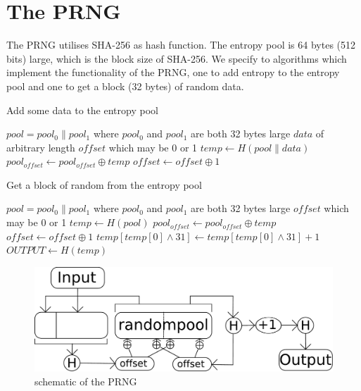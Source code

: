 \section{The PRNG}
The PRNG utilises SHA-256 as hash function.
The entropy pool is 64 bytes (512 bits) large, which is the block size of SHA-256.
We specify to algorithms which implement the functionality of the PRNG, one to add entropy to the entropy pool and one to get a block (32 bytes) of random data.
\begin{algorithm}
\caption{Add some data to the entropy pool}
\label{algAddEntropy}
\begin{algorithmic}
\REQUIRE $pool = pool_0 \parallel pool_1$ where $pool_0$ and $pool_1$ are both 32 bytes large
\REQUIRE $data$ of arbitrary length
\REQUIRE $offset$ which may be 0 or 1
\STATE $temp \leftarrow H(pool \parallel data)$
\STATE $pool_{offset} \leftarrow pool_{offset} \oplus temp$
\STATE $offset \leftarrow offset \oplus 1$
\end{algorithmic}
\end{algorithm}

\begin{algorithm}
\caption{Get a block of random from the entropy pool}
\label{algGetRandom}
\begin{algorithmic}
\REQUIRE $pool = pool_0 \parallel pool_1$ where $pool_0$ and $pool_1$ are both 32 bytes large
\REQUIRE $offset$ which may be 0 or 1
\STATE $temp \leftarrow H(pool)$
\STATE $pool_{offset} \leftarrow pool_{offset} \oplus temp$
\STATE $offset \leftarrow offset \oplus 1$
\STATE $temp[temp[0] \wedge 31] \leftarrow temp[temp[0] \wedge 31] + 1$
\STATE $OUTPUT \leftarrow H(temp)$
\end{algorithmic}
\end{algorithm}

\begin{figure}
\includegraphics[scale=0.3]{PRNG} 
\caption{schematic of the PRNG}
\end{figure}